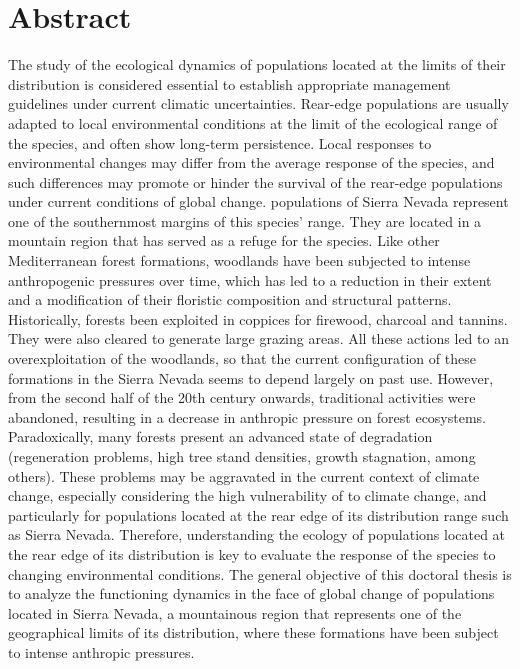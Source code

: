 \vspace*{20mm}

\section*{Abstract}\label{sec:abstract}
The study of the ecological dynamics of populations located at the limits of their distribution is considered essential to establish appropriate management guidelines under current climatic uncertainties. Rear-edge populations are usually adapted to local environmental conditions at the limit of the ecological range of the species, and often show long-term persistence. Local responses to environmental changes may differ from the average response of the species, and such differences may promote or hinder the survival of the rear-edge populations under current conditions of global change. \Qp populations of Sierra Nevada represent one of the southernmost margins of this species' range. They are located in a mountain region that has served as a refuge for the species. Like other Mediterranean forest formations, \Qp woodlands have been subjected to intense anthropogenic pressures over time, which has led to a reduction in their extent and a modification of their floristic composition and structural patterns. Historically, \Qp forests been exploited in coppices for firewood, charcoal and tannins. They were also cleared to generate large grazing areas. All these actions led to an overexploitation of the \Qp woodlands, so that the current configuration of these formations in the Sierra Nevada seems to depend largely on past use. However, from the second half of the 20th century onwards, traditional activities were abandoned, resulting in a decrease in anthropic pressure on forest ecosystems. Paradoxically, many \Qp forests present an advanced state of degradation (regeneration problems, high tree stand densities, growth stagnation, among others). These problems may be aggravated in the current context of climate change, especially considering the high vulnerability of \Qp to climate change, and particularly for populations located at the rear edge of its distribution range such as Sierra Nevada. Therefore, understanding the ecology of populations located at the rear edge of its distribution is key to evaluate the response of the species to changing environmental conditions. The general objective of this doctoral thesis is to analyze the functioning dynamics in the face of global change  of \Qp populations located in Sierra Nevada, a mountainous region that represents one of the geographical limits of its distribution, where these formations have been subject to intense anthropic pressures. 

